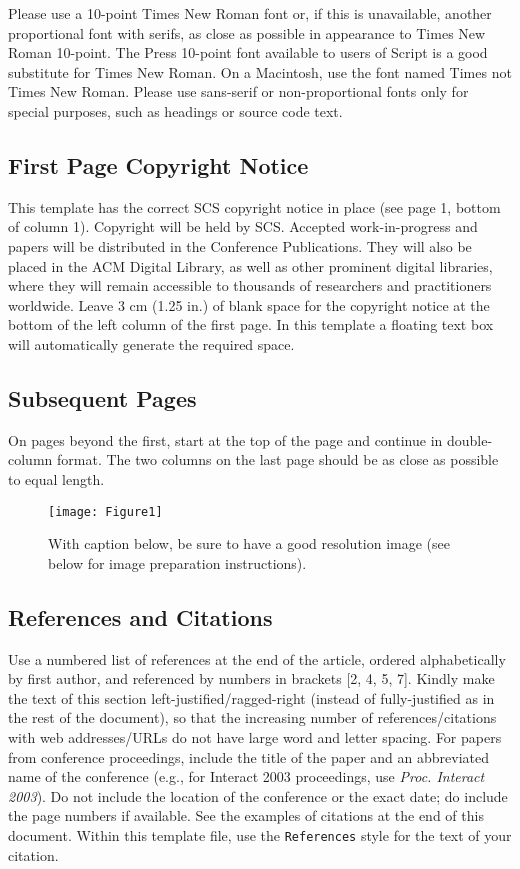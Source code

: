 \documentclass{scsPaperFormattingTemplate-LaTex-Revised20160302}
\begin{document}
Please use a 10-point Times New Roman font or, if this is unavailable, another proportional font with serifs, as close as possible in appearance to Times New Roman 10-point. The Press 10-point font available to users of Script is a good substitute for Times New Roman. On a Macintosh, use the font named Times not Times New Roman. Please use sans-serif or non-proportional fonts only for special purposes, such as headings or source code text.

\subsection{First Page Copyright Notice}

This template has the correct SCS copyright notice in place (see page 1, bottom of column 1). Copyright will be held by SCS. Accepted work-in-progress and papers will be distributed in the Conference Publications. They will also be placed in the ACM Digital Library, as well as other prominent digital libraries, where they will remain accessible to thousands of researchers and practitioners worldwide.  Leave 3 cm (1.25 in.) of blank space for the copyright notice at the bottom of the left column of the first page. In this template a floating text box will automatically generate the required space.

\subsection{Subsequent Pages}

On pages beyond the first, start at the top of the page and continue in double-column format. The two columns on the last page should be as close as possible to equal length.

\begin{figure}[!h]
\centering
\texttt{[image: Figure1]}
\caption{With caption below, be sure to have a good resolution image (see below for image preparation instructions).}
\label{fig:figure1}
\end{figure}

\subsection{References and Citations}

Use a numbered list of references at the end of the article, ordered alphabetically by first author, and referenced by numbers in brackets [2, 4, 5, 7]. Kindly make the text of this section left-justified/ragged-right (instead of fully-justified as in the rest of the document), so that the increasing number of references/citations with web addresses/URLs do not have large word and letter spacing. For papers from conference proceedings, include the title of the paper and an abbreviated name of the conference (e.g., for Interact 2003 proceedings, use \textit{Proc. Interact 2003}). Do not include the location of the conference or the exact date; do include the page numbers if available. See the examples of citations at the end of this document. Within this template file, use the \texttt{References} style
for the text of your citation.
\end{document}
